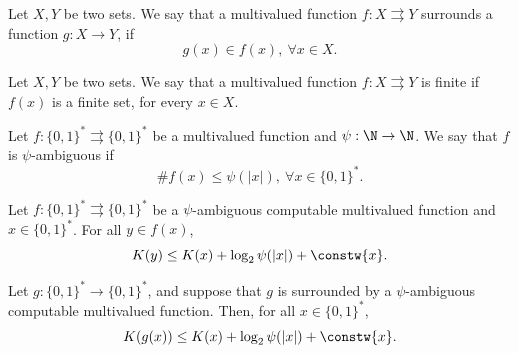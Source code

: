 \begin{doubtfulsec}
    
    \begin{definition}\label{def:surrounding_multivalued_function}
        Let $X,Y$ be two sets. We say that a multivalued function $f: X \rightrightarrows Y$ surrounds a function $g : X \to Y$, if
        \begin{equation}
            g(x) \in f(x), \ \forall x \in X.
        \end{equation}
    \end{definition}
    
    
    \begin{definition}\label{def:finite_multivalued_function}
        Let $X,Y$ be two sets. We say that a multivalued function $f : X \rightrightarrows Y$ is finite if $f(x)$ is a finite set, for every $x \in X$.
    \end{definition}
    
    
    \begin{definition}\label{def:ambiguous_multivalued_function}
        Let $f: \{0,1\}^\ast \rightrightarrows \{0,1\}^\ast$ be a multivalued function and $\psi : \N \to \N$. We say that $f$ is $\psi$-ambiguous if 
        \begin{equation}
            \# f(x) \leq \psi(|x|), \ \forall x \in \{0,1\}^\ast.
        \end{equation}
    \end{definition}
    
    
    \begin{theorem}
        Let $f: \{0,1\}^\ast \rightrightarrows \{0,1\}^\ast$ be a $\psi$-ambiguous computable multivalued function and $x \in \{0,1\}^\ast$. For all $y \in f(x)$,
        \begin{equation}
            K(y) \leq K(x) + \log_2 \psi(|x|) + \constw{x}.
        \end{equation}
    \end{theorem}
    
    \begin{corollary}
        Let $g : \{0,1\}^\ast \to \{0,1\}^\ast$, and suppose that $g$ is surrounded by a $\psi$-ambiguous computable multivalued function. Then, for all $x \in \{0,1\}^\ast$,
        \begin{equation}
            K(g(x)) \leq K(x) + \log_2 \psi(|x|) + \constw{x}.
        \end{equation}
    \end{corollary}
    \end{doubtfulsec}
    
